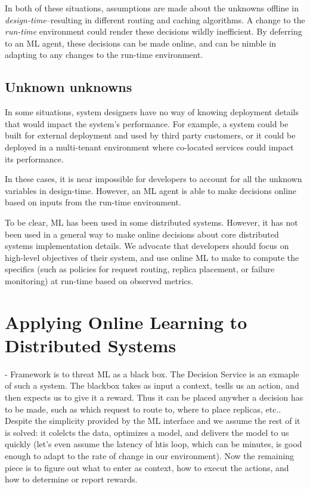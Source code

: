 \documentclass[a4paper,twocolumn]{article}
\begin{document}
In both of these situations, assumptions are made about the unknowns offline in
\emph{design-time}--resulting in different routing and caching
algorithms. A change to the \emph{run-time} environment could render these
decisions wildly inefficient. By deferring to an ML agent, these decisions can
be made online, and can be nimble in adapting to any changes to the run-time
environment.

\subsection*{Unknown unknowns}
In some situations, system designers have no way of knowing deployment details
that would impact the system's performance. For example, a system could be built
for external deployment and used by third party customers, or it could be
deployed in a multi-tenant environment where co-located services could impact
its performance.

In these cases, it is near impossible for developers to account for all the
unknown variables in design-time. However, an ML agent is able to make decisions
online based on inputs from the run-time environment.

To be clear, ML has been used in some distributed systems. However, it has not
been used in a general way to make online decisions about core distributed
systems implementation details. We advocate that developers should focus on
high-level objectives of their system, and use online ML to make to compute the
specifics (such as policies for request routing, replica placement, or failure
monitoring) at run-time based on observed metrics.


\section{Applying Online Learning to Distributed Systems}

- Framework is to threat ML as a black box. The Decision Service is an exmaple of such a system.
The blackbox takes as input a context, teslls us an action, and then expects us to give it
a reward. Thus it can be placed anywher a decision has to be made, such as which request
to route to, where to place replicas, etc.. Despite the simplicity provided by the ML interface
and we assume the rest of it is solved: it colelcts the data, optimizes a model, and delivers the model
to us quickly (let's even assume the latency of htis loop, which can be minutes, is good enough to adapt
to the rate of change in our environment). Now the remaining piece is to figure out what
to enter as context, how to execut the actions, and how to determine or report rewards.
\end{document}

